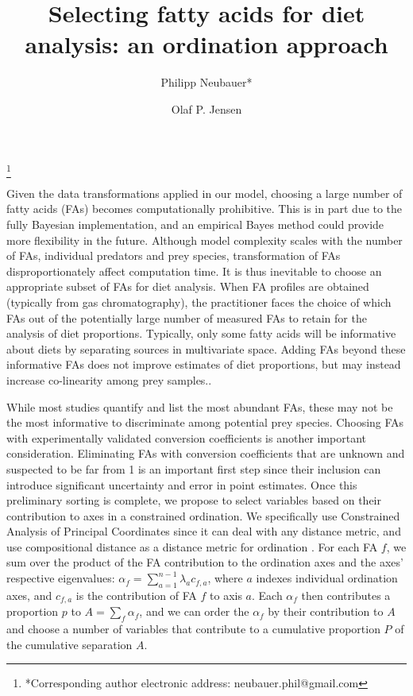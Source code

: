 \documentclass[12pt]{article}
\begin{document}
\renewcommand\footnotemark{}

\author{Philipp Neubauer*}\thanks{*Corresponding author electronic address: neubauer.phil@gmail.com}%
%

\author{Olaf P. Jensen}%
%


\title{Selecting fatty acids for diet analysis: an ordination approach}
\maketitle

Given the data transformations applied in our model, choosing a large
number of fatty acids (FAs) becomes computationally
prohibitive. This is in part due to the fully Bayesian implementation,
and an empirical Bayes method could provide more flexibility in the
future. Although model complexity scales with the number of FAs,
individual predators and prey species, transformation of FAs disproportionately affect computation time. It is thus inevitable to
choose an appropriate subset of FAs for diet analysis. When FA
profiles are obtained (typically from gas chromatography), the
practitioner faces the choice of which FAs out of the potentially
large number of measured FAs to retain for the analysis of diet
proportions. Typically, only some fatty acids will be informative about diets by separating sources in multivariate space. Adding FAs beyond these informative FAs does not improve estimates of diet proportions, but may instead increase co-linearity among prey samples..

While most studies quantify and list the most abundant FAs, these may
not be the most informative to discriminate among potential prey
species. Choosing FAs with experimentally validated conversion
coefficients is another important consideration. Eliminating FAs with
conversion coefficients that are unknown and suspected to be far from
1 is an important first step since their inclusion can introduce
significant uncertainty and error in point estimates. Once this
preliminary sorting is complete, we propose to select variables based
on their contribution to axes in a constrained ordination. We
specifically use Constrained Analysis of Principal Coordinates
\citep{anderson_canonical_2003} since it can deal with any distance
metric, and use compositional distance as a distance metric for
ordination \cite{aitchison_logratio_2000}. For each FA $f$, we sum over
the product of the FA contribution to the ordination axes and the
axes’ respective eigenvalues: $\alpha_f = \sum_{a=1}^{n-1} \lambda_a
c_{f,a}$, where $a$ indexes individual ordination axes, and $c_{f,a}$ is the
contribution of FA $f$ to axis $a$. Each $\alpha_f$ then contributes a
proportion $p$ to $A=\sum_f \alpha_f$, and we can order the $\alpha_f$ by their contribution to $A$ and choose a
number of variables that contribute to a cumulative proportion $P$ of the
cumulative separation $A$.


\printbibliography
\end{document}
